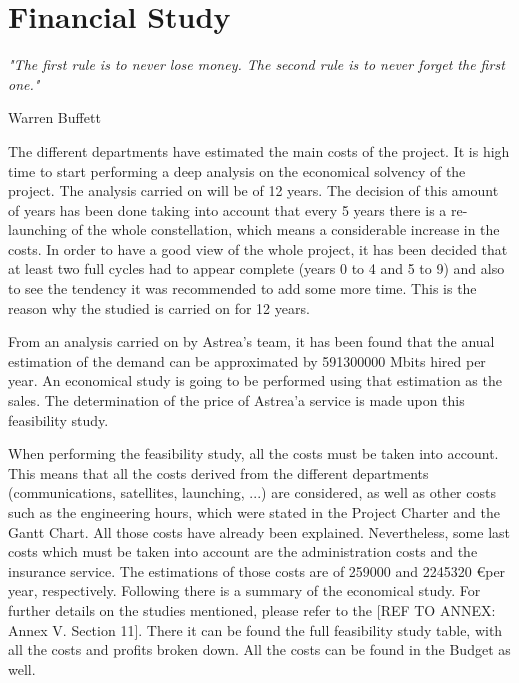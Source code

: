 \chapter{Financial Study}
\epigraph{\textit{"The first rule is to never lose money. The second rule is to never forget the first one."}}{Warren Buffett} 

The different departments have estimated the main costs of the project. It is high time to start performing a deep analysis on the economical solvency of the project. The analysis carried on will be of 12 years. The decision of this amount of years has been done taking into account that every 5 years there is a re-launching of the whole constellation, which means a considerable increase in the costs. In order to have a good view of the whole project, it has been decided that at least two full cycles had to appear complete (years 0 to 4 and 5 to 9) and also to see the tendency it was recommended to add some more time. This is the reason why the studied is carried on for 12 years.

From an analysis carried on by Astrea's team, it has been found that the anual estimation of the demand can be approximated by 591300000 Mbits hired per year. An economical study is going to be performed using that estimation as the sales. The determination of the price of Astrea'a service is made upon this feasibility study. 

When performing the feasibility study, all the costs must be taken into account. This means that all the costs derived from the different departments (communications, satellites, launching, ...) are considered, as well as other costs such as the engineering hours, which were stated in the Project Charter and the Gantt Chart. All those costs have already been explained. Nevertheless, some last costs which must be taken into account are the administration costs and the insurance service. The estimations of those costs are of 259000 and 2245320 \euro  per year, respectively. Following there is a summary of the economical study. For further details on the studies mentioned, please refer to the [{REF TO ANNEX: Annex V. Section 11}]. There it can be found the full feasibility study table, with all the costs and profits broken down. All the costs can be found in the Budget as well.




